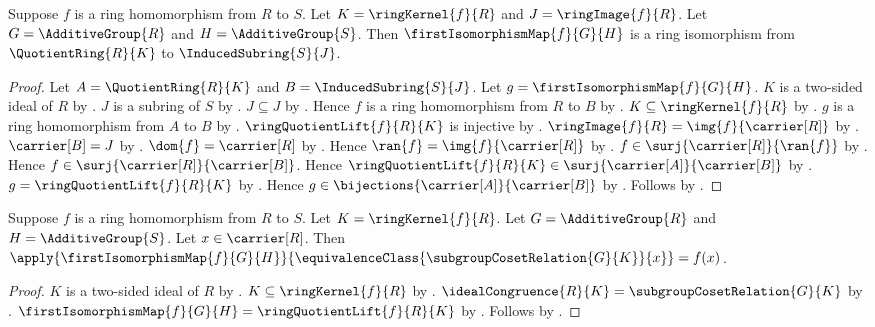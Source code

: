 \begin{theorem}\label{ring_first_isomorphism_theorem}
    Suppose $f$ is a ring homomorphism from $R$ to $S$.
    Let $K=\ringKernel{f}{R}$ and $J=\ringImage{f}{R}$.
    Let $G=\AdditiveGroup{R}$ and $H=\AdditiveGroup{S}$.
    Then $\firstIsomorphismMap{f}{G}{H}$ is a ring isomorphism from
        $\QuotientRing{R}{K}$ to $\InducedSubring{S}{J}$.
\end{theorem}
\begin{proof}
    Let $A=\QuotientRing{R}{K}$ and $B=\InducedSubring{S}{J}$.
    Let $g=\firstIsomorphismMap{f}{G}{H}$.
    $K$ is a two-sided ideal of $R$ by
        .
    $J$ is a subring of $S$ by .
    $J\subseteq J$ by .
    Hence $f$ is a ring homomorphism from $R$ to $B$ by
        .
    $K\subseteq\ringKernel{f}{R}$ by .
    $g$ is a ring homomorphism from $A$ to $B$ by
        .
    $\ringQuotientLift{f}{R}{K}$ is injective by
        .
    $\ringImage{f}{R}=\img{f}{\carrier[R]}$ by .
    $\carrier[B]=J$ by .
    $\dom{f}=\carrier[R]$ by
        .
    Hence $\ran{f}=\img{f}{\carrier[R]}$ by .
    $f\in\surj{\carrier[R]}{\ran{f}}$ by
        .
    Hence $f\in\surj{\carrier[R]}{\carrier[B]}$.
    Hence $\ringQuotientLift{f}{R}{K}\in
        \surj{\carrier[A]}{\carrier[B]}$ by
        .
    $g=\ringQuotientLift{f}{R}{K}$ by
        .
    Hence $g\in\bijections{\carrier[A]}{\carrier[B]}$ by
        .
    Follows by .
\end{proof}

\begin{proposition}\label{ring_first_isomorphism_map_apply}
    Suppose $f$ is a ring homomorphism from $R$ to $S$.
    Let $K=\ringKernel{f}{R}$.
    Let $G=\AdditiveGroup{R}$ and $H=\AdditiveGroup{S}$.
    Let $x\in\carrier[R]$.
    Then
        $\apply{\firstIsomorphismMap{f}{G}{H}}{
            \equivalenceClass{\subgroupCosetRelation{G}{K}}{x}}
        =f(x)$.
\end{proposition}
\begin{proof}
    $K$ is a two-sided ideal of $R$ by
        .
    $K\subseteq\ringKernel{f}{R}$ by .
    $\idealCongruence{R}{K}=\subgroupCosetRelation{G}{K}$ by
        .
    $\firstIsomorphismMap{f}{G}{H}
        =\ringQuotientLift{f}{R}{K}$ by
        .
    Follows by .
\end{proof}

